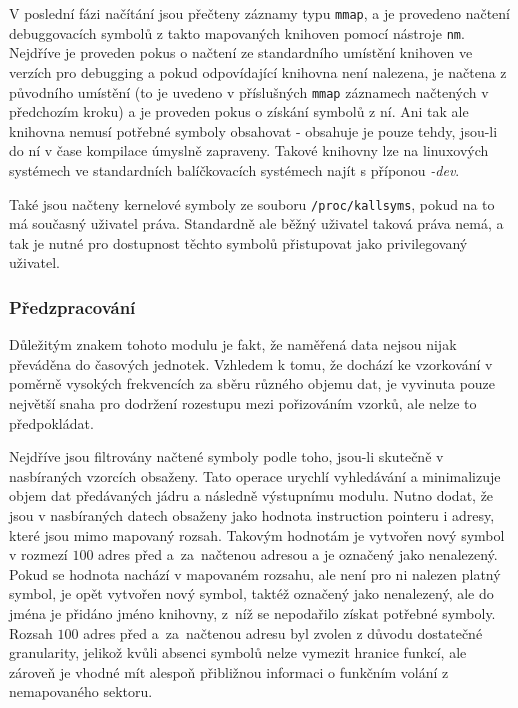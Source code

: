 \documentclass[czech,BP]{thesiskiv}
\begin{document}
V poslední fázi načítání jsou přečteny záznamy typu \texttt{mmap}, a je provedeno načtení debuggovacích symbolů z takto mapovaných knihoven pomocí nástroje \texttt{nm}. Nejdříve je proveden pokus o načtení ze standardního umístění knihoven ve verzích pro debugging a pokud odpovídající knihovna není nalezena, je načtena z původního umístění (to je uvedeno v příslušných \texttt{mmap} záznamech načtených v předchozím kroku) a je proveden pokus o získání symbolů z ní. Ani tak ale knihovna nemusí potřebné symboly obsahovat - obsahuje je pouze tehdy, jsou-li do ní v čase kompilace úmyslně zapraveny. Takové knihovny lze na linuxových systémech ve standardních balíčkovacích systémech najít s příponou \emph{-dev}.

Také jsou načteny kernelové symboly ze souboru \texttt{/proc/kallsyms}, pokud na to má současný uživatel práva. Standardně ale běžný uživatel taková práva nemá, a tak je nutné pro dostupnost těchto symbolů přistupovat jako privilegovaný uživatel.

\subsubsection*{Předzpracování}

Důležitým znakem tohoto modulu je fakt, že naměřená data nejsou nijak převáděna do časových jednotek. Vzhledem k tomu, že dochází ke vzorkování v poměrně vysokých frekvencích za sběru různého objemu dat, je vyvinuta pouze největší snaha pro dodržení rozestupu mezi pořizováním vzorků, ale nelze to předpokládat.

Nejdříve jsou filtrovány načtené symboly podle toho, jsou-li skutečně v nasbíraných vzorcích obsaženy. Tato operace urychlí vyhledávání a minimalizuje objem dat předávaných jádru a následně výstupnímu modulu. Nutno dodat, že jsou v nasbíraných datech obsaženy jako hodnota instruction pointeru i adresy, které jsou mimo mapovaný rozsah. Takovým hodnotám je vytvořen nový  symbol v rozmezí $100$ adres před a~za~načtenou adresou a je označený jako nenalezený. Pokud se hodnota nachází v mapovaném rozsahu, ale není pro ni nalezen platný symbol, je opět vytvořen nový symbol, taktéž označený jako nenalezený, ale do jména je přidáno jméno knihovny, z~níž se nepodařilo získat potřebné symboly. Rozsah $100$ adres před a~za~načtenou adresu byl zvolen z důvodu dostatečné granularity, jelikož kvůli absenci symbolů nelze vymezit hranice funkcí, ale zároveň je vhodné mít alespoň přibližnou informaci o funkčním volání z nemapovaného sektoru.
\end{document}
